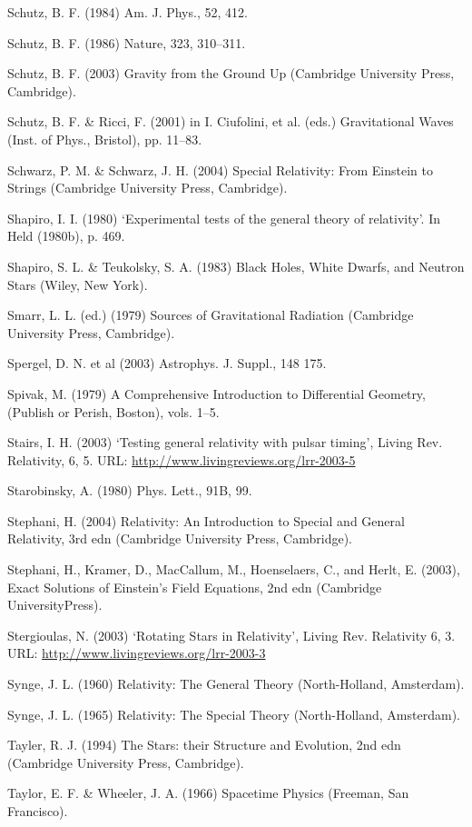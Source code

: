 {Schutz, B. F. (1984) Am. J. Phys., 52, 412.


Schutz, B. F. (1986) Nature, 323, 310–311.


Schutz, B. F. (2003) Gravity from the Ground Up (Cambridge University Press, Cambridge).


Schutz, B. F. \& Ricci, F. (2001) in I. Ciufolini, et al. (eds.) Gravitational Waves (Inst. of Phys., Bristol), pp. 11–83.


Schwarz, P. M. \& Schwarz, J. H. (2004) Special Relativity: From Einstein to Strings (Cambridge University Press, Cambridge).


Shapiro, I. I. (1980) ‘Experimental tests of the general theory of relativity’. In Held (1980b), p. 469.


Shapiro, S. L. \& Teukolsky, S. A. (1983) Black Holes, White Dwarfs, and Neutron Stars (Wiley, New York).


Smarr, L. L. (ed.) (1979) Sources of Gravitational Radiation (Cambridge University Press, Cambridge).


Spergel, D. N. et al (2003) Astrophys. J. Suppl., 148 175.


Spivak, M. (1979) A Comprehensive Introduction to Differential Geometry, (Publish or Perish, Boston), vols. 1–5.


Stairs, I. H. (2003) ‘Testing general relativity with pulsar timing’, Living Rev. Relativity, 6,
5. URL: \url{http://www.livingreviews.org/lrr-2003-5}


Starobinsky, A. (1980) Phys. Lett., 91B, 99.


Stephani, H. (2004) Relativity: An Introduction to Special and General Relativity, 3rd edn (Cambridge University Press, Cambridge).


Stephani, H., Kramer, D., MacCallum, M., Hoenselaers, C., and Herlt, E. (2003), Exact Solutions of Einstein’s Field Equations, 2nd edn (Cambridge UniversityPress).


Stergioulas, N. (2003) ‘Rotating Stars in Relativity’, Living Rev. Relativity 6, 3. URL:
\url{http://www.livingreviews.org/lrr-2003-3}


Synge, J. L. (1960) Relativity: The General Theory (North-Holland, Amsterdam).


Synge, J. L. (1965) Relativity: The Special Theory (North-Holland, Amsterdam).


Tayler, R. J. (1994) The Stars: their Structure and Evolution, 2nd edn (Cambridge University Press, Cambridge).


Taylor, E. F. \& Wheeler, J. A. (1966) Spacetime Physics (Freeman, San Francisco).


}
